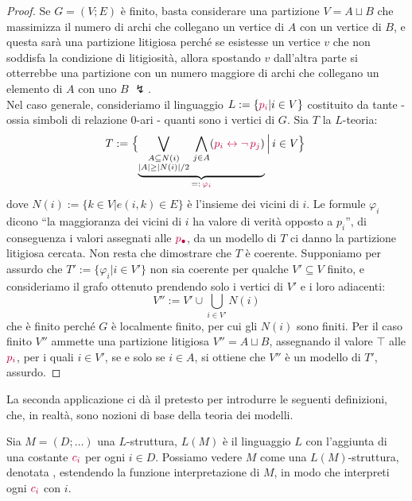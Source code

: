 \begin{proof}
    Se $G = (V;E)$ è finito, basta considerare una partizione $V = A \sqcup B$ che massimizza il numero di archi che collegano un vertice di $A$ con un vertice di $B$,
    e questa sarà una partizione litigiosa perché se esistesse un vertice $v$ che non soddisfa la condizione di litigiosità, allora spostando $v$ dall'altra parte si otterrebbe una partizione con un numero maggiore di archi che collegano un elemento di $A$ con uno $B$ $\lightning$.\\
    Nel caso generale, consideriamo il linguaggio $L := \{\textcolor{purple}{p_i} | i \in V\}$ costituito da tante  - ossia simboli di relazione 0-ari - quanti sono i vertici di $G$. Sia $T$ la $L$-teoria:
    \[ T := \left\{\smash[b]{\underbrace{\bigvee_{\substack{A \subseteq N(i) \\ |A| \geq |N(i)|/2}}\vphantom{\bigwedge_{j \in A} (\purple{p_i \leftrightarrow \neg\, p_j})}\bigwedge_{j \in A} (\purple{p_i \leftrightarrow \neg\, p_j})}_{=:\,\purple{\varphi_i}}} \,\middle|\, i \in V\right\}\vphantom{\underbrace{\bigvee_{\substack{A \subseteq N(i) \\ |A| \geq |N(i)|/2}}\vphantom{\bigwedge_{j \in A} (\purple{p_i \leftrightarrow \neg\, p_j})}\bigwedge_{j \in A} (\purple{p_i \leftrightarrow \neg\, p_j})}_{=:\,\purple{\varphi_i}}} \]
    dove $N(i) := \{k \in V | e(i,k) \in E\}$ è l'insieme dei vicini di $i$. Le formule $\varphi_i$ dicono ``la maggioranza dei vicini di $i$ ha valore di verità opposto a $p_i$'',
    di conseguenza i valori assegnati alle $\textcolor{purple}{p_{\bullet}}$, da un modello di $T$ ci danno la partizione litigiosa cercata. Non resta che dimostrare che $T$ è coerente.
    Supponiamo per assurdo che $T' := \{\varphi_i | i \in V'\}$ non sia coerente per qualche $V' \subseteq V$ finito, e consideriamo il grafo ottenuto prendendo solo i vertici di $V'$ e i loro adiacenti:
    \[ V'' := V' \cup \bigcup_{i \in V'} N(i) \]
    che è finito perché $G$ è localmente finito, per cui gli $N(i)$ sono finiti. Per il caso finito $V''$ ammette una partizione litigiosa $V'' = A \sqcup B$,
    assegnando il valore $\top$ alle $\textcolor{purple}{p_i}$, per i quali $i \in V'$, se e solo se $i \in A$, si ottiene che $V''$ è un modello di $T'$, assurdo.
\end{proof}

La seconda applicazione ci dà il pretesto per introdurre le seguenti definizioni, che, in realtà, sono nozioni di base della teoria dei modelli.

\begin{definition}
    Sia $M = (D;\ldots)$ una $L$-struttura, $L(M)$ è il linguaggio $L$  con l'aggiunta di una costante $\textcolor{purple}{c_i}$ per ogni $i \in D$. 
    Possiamo vedere $M$ come una $L(M)$-struttura, denotata , estendendo la funzione interpretazione di $M$, in modo che interpreti ogni $\textcolor{purple}{c_i}$ con $i$.
\end{definition}

